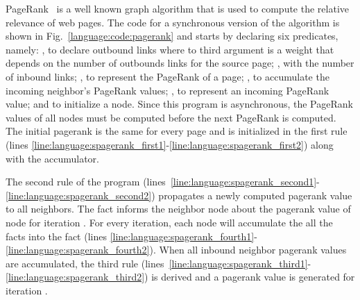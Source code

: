 PageRank~\cite{Page:2001:MNR} is a well known graph algorithm that is used to
compute the relative relevance of web pages.  The code for a synchronous version
of the algorithm is shown in Fig.~\ref{language:code:pagerank} and starts by
declaring six predicates, namely: , to declare outbound links
where to third argument is a weight that depends on the number of outbounds
links for the source page; , with the number of inbound links;
, to represent the PageRank of a page; , to
accumulate the incoming neighbor's PageRank values; , to
represent an incoming PageRank value; and  to initialize a node.
Since this program is asynchronous, the PageRank values of all nodes must be
computed before the next PageRank is computed. The initial pagerank is the same
for every page and is initialized in the first rule (lines
\ref{line:language:spagerank_first1}-\ref{line:language:spagerank_first2}) along
with the accumulator.

The second rule of the program
(lines~\ref{line:language:spagerank_second1}-\ref{line:language:spagerank_second2})
propagates a newly computed pagerank value to all neighbors. The fact
 informs the neighbor node about the pagerank value of
node  for iteration . For every iteration, each node will
accumulate the all the  facts into the
 fact (lines
\ref{line:language:spagerank_fourth1}-\ref{line:language:spagerank_fourth2}).
When all inbound neighbor pagerank values are accumulated, the third rule
(lines~\ref{line:language:spagerank_third1}-\ref{line:language:spagerank_third2})
is derived and a pagerank value is generated for iteration .

